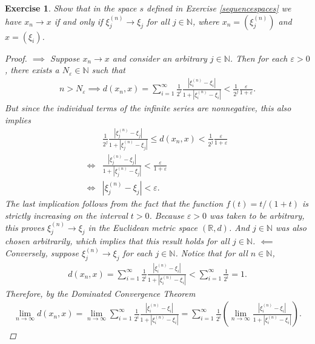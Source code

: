 \documentclass[11pt]{article}
\theoremstyle{mystyle}
\newtheorem{protoexer}{Exercise}[section]
\newenvironment{exer}
{\colorlet{shadecolor}{blue!15}\begin{shaded}\begin{protoexer}}
{\end{protoexer}\end{shaded}}
\begin{document}
\begin{exer}
Show that in the space $s$ defined in Exercise \ref{sequencespaces} we have $x_n \longrightarrow x$ if and only if $\xi_j^{(n)} \longrightarrow \xi_j$ for all $j \in \mathbb{N}$, where $x_n = (\xi_j^{(n)})$ and $x = (\xi_i)$.
\begin{proof}
$\implies$ Suppose $x_n \longrightarrow x$ and consider an arbitrary $j \in \mathbb{N}$. Then for each $\varepsilon > 0$, there exists a $N_{\varepsilon} \in \mathbb{N}$ such that 
\begin{align*}
   n > N_{\varepsilon} \implies d(x_n, x) = \sum_{i=1}^{\infty} \frac{1}{2^i} \frac{|\xi_i^{(n)} - \xi_i|}{1 + |\xi_i^{(n)} - \xi_i|} < \frac{1}{2^j}\frac{\varepsilon}{1+\varepsilon}.
\end{align*}
But since the individual terms of the infinite series are nonnegative, this also implies 
\begin{align*}
    &\frac{1}{2^j} \frac{|\xi_j^{(n)} - \xi_j|}{1 + |\xi_j^{(n)} - \xi_j|} \leq d(x_n, x) < \frac{1}{2^j}\frac{\varepsilon}{1+\varepsilon}\\
    \iff& \frac{|\xi_j^{(n)} - \xi_j|}{1 + |\xi_j^{(n)} - \xi_j|} < \frac{\varepsilon}{1+\varepsilon}\\
    \iff&  |\xi_j^{(n)} - \xi_j| < \varepsilon.
\end{align*}
The last implication follows from the fact that the function $f(t) = t/(1+t)$ is strictly increasing on the interval $t > 0$. Because $\varepsilon > 0$ was taken to be arbitrary, this proves $\xi_j^{(n)} \longrightarrow \xi_j$ in the Euclidean metric space $(\mathbb{R}, d)$. And $j \in \mathbb{N}$ was also chosen arbitrarily, which implies that this result holds for all $j \in \mathbb{N}$.\newline
$\impliedby$ Conversely, suppose $\xi_j^{(n)} \longrightarrow \xi_j$ for each $j \in \mathbb{N}$. Notice that for all $n \in \mathbb{N}$,
\begin{align*}
    d(x_n, x) = \sum_{i=1}^{\infty} \frac{1}{2^i}\frac{|\xi_i^{(n)} - \xi_i|}{1 + |\xi_i^{(n)} - \xi_i|} < \sum_{i=1}^{\infty}\frac{1}{2^i} = 1.
\end{align*}
Therefore, by the Dominated Convergence Theorem\footnotemark
\begin{align*}
    \lim_{n \to \infty} d(x_n, x) = \lim_{n \to \infty} \sum_{i=1}^{\infty} \frac{1}{2^i}\frac{|\xi_i^{(n)} - \xi_i|}{1 + |\xi_i^{(n)} - \xi_i|} =  \sum_{i=1}^{\infty} \frac{1}{2^i} \left( \lim_{n \to \infty}\frac{|\xi_i^{(n)} - \xi_i|}{1 + |\xi_i^{(n)} - \xi_i|} \right).
\end{align*}

\end{proof}
\end{exer}
\end{document}
